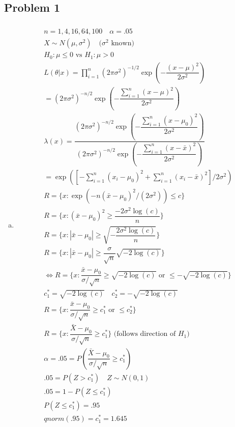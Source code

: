 \documentclass{article}
\newcommand{\sg}{\sigma}
\newcommand{\sumn}{\sum_{i=1}^{n}}
\newcommand{\lra}{\Leftrightarrow}
\newcommand{\prodn}{\prod_{i=1}^{n}}
\newcommand{\ta}{\theta}
\newcommand{\lx}{\lambda(x)}
\begin{document}
\begin{flushleft}

	\section*{Problem 1}
	
\begin{enumerate}[(a)]
	
	\item 
\begin{multline*}\\
n=1,4,16,64,100 \quad \alpha=.05\\
X\sim N(\mu,\sg^2) \quad(\sg^2\text{ known)}\\
H_0:\mu\leq 0 \text{ vs } H_1:\mu>0\\
L(\ta|x)=\prodn(2\pi \sg^2)^{-1/2} \exp\left(-\dfrac{(x-\mu)^2}{2\sg^2} \right)\\
=(2\pi \sg^2)^{-n/2}\exp\left(-\dfrac{\sumn(x-\mu)^2}{2\sg^2} \right)\\
\lx=\dfrac{(2\pi \sg^2)^{-n/2}\exp\left(-\dfrac{\sumn(x-\mu_0)^2}{2\sg^2} \right)}{(2\pi \sg^2)^{-n/2}\exp\left(-\dfrac{\sumn(x-\bar{x})^2}{2\sg^2} \right)}\\
=\exp\left(\left[-\sumn(x_i-\mu_0)^2+\sumn(x_i-\bar{x})^2 \right]/2\sg^2\right)\\
R=\{x:\exp\left(-n(\bar{x}-\mu_0)^2/(2\sg^2)\right)\leq c\}\\
R=\{x:(\bar{x}-\mu_0)^2\geq\dfrac{-2\sg^2\log(c)}{n} \}\\
R=\{x:|\bar{x}-\mu_0|\geq\sqrt{-\dfrac{2\sg^2\log(c)}{n}} \}\\
R=\{x:|\bar{x}-\mu_0|\geq \dfrac{\sg}{\sqrt{n}}\sqrt{-2\log(c)} \}\\
\lra
R=\{x:\dfrac{\bar{x}-\mu_0}{\sg/\sqrt{n}}\geq \sqrt{-2\log(c)} \text{ or } \leq -\sqrt{-2\log(c)} \}\\
c_1^*=\sqrt{-2\log(c)} \quad c_2^*=-\sqrt{-2\log(c)}\\
R=\{x:\dfrac{\bar{x}-\mu_0}{\sg/\sqrt{n}}\geq c_1^* \text{ or } \leq c_2^* \}\\
R=\{x:\dfrac{\bar{X}-\mu_0}{\sg/\sqrt{n}}\geq c_1^* \} \text{ (follows direction of } H_1)\\
\alpha=.05=P\left(\dfrac{\bar{X}-\mu_0}{\sg/\sqrt{n}}\geq c_1^*\right)\\
.05=P(Z>c_1^*) \quad Z\sim N(0,1)\\
.05=1-P(Z\leq c_1^*)\\
P(Z\leq c_1^*)=.95\\
qnorm(.95)=c_1^*=1.645\\

\end{multline*}
\end{enumerate}
\end{flushleft}
\end{document}
